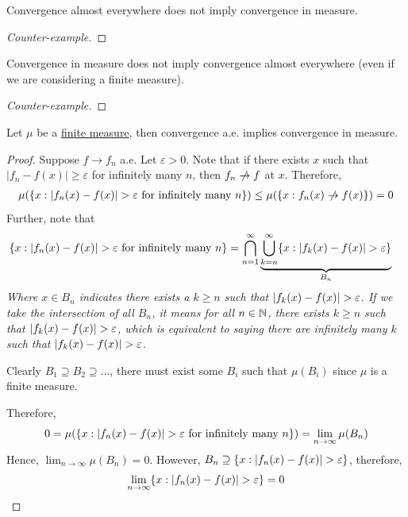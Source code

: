 \documentclass[11pt]{article}
\begin{document}
	\begin{remark}
		Convergence almost everywhere does not imply convergence in measure.
		\begin{proof}[Counter-example]
			
		\end{proof}
	\end{remark}
	
	\begin{remark}
		Convergence in measure does not imply convergence almost everywhere (even if we are considering a finite measure).
		\begin{proof}[Counter-example]
			
		\end{proof}
	\end{remark}
	
	\begin{proposition}
		Let $\mu$ be a \ul{finite measure}, then convergence a.e. implies convergence in measure.
		\begin{proof}
			Suppose $f \to f_n$ a.e. Let $\varepsilon > 0$. Note that if there exists $x$ such that $|f_n - f(x)| \geq \varepsilon$ for infinitely many $n$, then $f_n \centernot{\to} f$ at $x$.
			Therefore,
			\begin{align}
				\mu(\{x: \abs{f_n(x) - f(x)} > \varepsilon \tx{ for infinitely many $n$}\}) \leq \mu(\{x: f_n(x) \centernot{\to} f(x)\}) = 0
			\end{align}
			Further, note that
			\begin{align}
				\{x: \left \vert {f_n(x) - f(x)} \right \vert > \varepsilon \text{{ for infinitely many $n$}}\}
				&= \bigcap_{n=1}^\infty 
				\underbrace{\bigcup_{k=n}^\infty \{x : \left \vert {f_k(x) - f(x)} \right \vert > \varepsilon\}}_{B_n}
			\end{align}
			\emph{Where $x \in B_n$ indicates there exists a $k \geq n$ such that $\left \vert {f_k(x) - f(x)} \right \vert > \varepsilon$. If we take the intersection of all $B_n$, it means for all $n \in \mathbb{N}$, there exists $k \geq n$ such that $\left \vert {f_k(x) - f(x)} \right \vert > \varepsilon$, which is equivalent to saying there are infinitely many $k$ such that $\left \vert {f_k(x) - f(x)} \right \vert > \varepsilon$.}
			
			Clearly $B_1 \supseteq B_2 \supseteq \dots$, there must exist some $B_i$ such that $\mu(B_i)$ since $\mu$ is a finite measure.
			
			Therefore,
			\begin{align}
				0 = \mu(\{x: \left \vert {f_n(x) - f(x)} \right \vert > \varepsilon \text{{ for infinitely many $n$}}\}) = \lim_{n\to\infty} \mu(B_n)
			\end{align}
			Hence, $\lim_{n \to \infty} \mu(B_n) = 0$.
			However, $B_n \supseteq \{x : \left \vert {f_n(x) - f(x)} \right \vert > \varepsilon\}$, therefore,
			\begin{align}
				\lim_{n \to \infty} \{x : \left \vert {f_n(x) - f(x)} \right \vert > \varepsilon\} = 0
			\end{align}
		\end{proof}
	\end{proposition}
	
\end{document}
